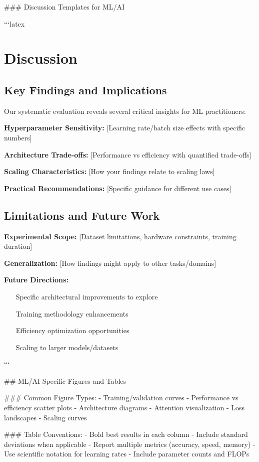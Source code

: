 \documentclass[11pt,a4paper]{article}
\begin{document}
### Discussion Templates for ML/AI

```latex
\section{Discussion}

\subsection{Key Findings and Implications}
Our systematic evaluation reveals several critical insights for ML practitioners:

\textbf{Hyperparameter Sensitivity:} [Learning rate/batch size effects with specific numbers]

\textbf{Architecture Trade-offs:} [Performance vs efficiency with quantified trade-offs]

\textbf{Scaling Characteristics:} [How your findings relate to scaling laws]

\textbf{Practical Recommendations:} [Specific guidance for different use cases]

\subsection{Limitations and Future Work}
\textbf{Experimental Scope:} [Dataset limitations, hardware constraints, training duration]

\textbf{Generalization:} [How findings might apply to other tasks/domains]

\textbf{Future Directions:} 
\begin{itemize}
    \item [Specific architectural improvements to explore]
    \item [Training methodology enhancements]
    \item [Efficiency optimization opportunities]
    \item [Scaling to larger models/datasets]
\end{itemize}
```

## ML/AI Specific Figures and Tables

### Common Figure Types:
- Training/validation curves
- Performance vs efficiency scatter plots
- Architecture diagrams
- Attention visualization
- Loss landscapes
- Scaling curves

### Table Conventions:
- Bold best results in each column
- Include standard deviations when applicable
- Report multiple metrics (accuracy, speed, memory)
- Use scientific notation for learning rates
- Include parameter counts and FLOPs
\end{document}

